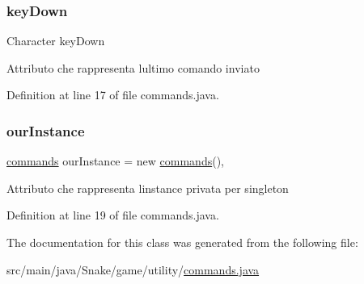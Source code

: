 \subsubsection{\texorpdfstring{key\+Down}{keyDown}}
{\footnotesize\ttfamily Character key\+Down\hspace{0.3cm}{\ttfamily [private]}}

Attributo che rappresenta l\textquotesingle{}ultimo comando inviato 

Definition at line 17 of file commands.\+java.

\mbox{\label{class_snake_1_1game_1_1utility_1_1commands_aa7a70ebde8ae359567827667a6ce1901}} 
\subsubsection{\texorpdfstring{our\+Instance}{ourInstance}}
{\footnotesize\ttfamily \mbox{\hyperlink{class_snake_1_1game_1_1utility_1_1commands}{commands}} our\+Instance = new \mbox{\hyperlink{class_snake_1_1game_1_1utility_1_1commands}{commands}}()\hspace{0.3cm}{\ttfamily [static]}, {\ttfamily [private]}}

Attributo che rappresenta l\textquotesingle{}instance privata per singleton 

Definition at line 19 of file commands.\+java.



The documentation for this class was generated from the following file\+:\begin{DoxyCompactItemize}
\item 
src/main/java/\+Snake/game/utility/\mbox{\hyperlink{commands_8java}{commands.\+java}}\end{DoxyCompactItemize}
